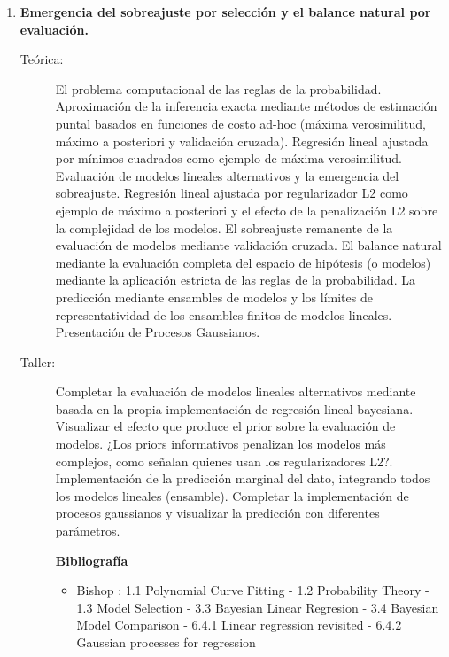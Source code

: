 \documentclass[11pt]{article}
\begin{document}
\begin{enumerate}
\item \textbf{Emergencia del sobreajuste por selección y el balance natural por evaluación.}
\vspace{-0.15cm}
\begin{description}
\item[Teórica:] El problema computacional de las reglas de la probabilidad. Aproximación de la inferencia exacta mediante métodos de estimación puntal basados en funciones de costo ad-hoc (máxima verosimilitud, máximo a posteriori y validación cruzada). Regresión lineal ajustada por mínimos cuadrados como ejemplo de máxima verosimilitud. Evaluación de modelos lineales alternativos y la emergencia del sobreajuste.
Regresión lineal ajustada por regularizador L2 como ejemplo de máximo a posteriori y el efecto de la penalización L2 sobre la complejidad de los modelos.
El sobreajuste remanente de la evaluación de modelos mediante validación cruzada.
El balance natural mediante la evaluación completa del espacio de hipótesis (o modelos) mediante la aplicación estricta de las reglas de la probabilidad.
La predicción mediante ensambles de modelos y los límites de representatividad de los ensambles finitos de modelos lineales.
Presentación de Procesos Gaussianos.
\item[Taller:]
Completar la evaluación de modelos lineales alternativos mediante basada en la propia implementación de regresión lineal bayesiana.
Visualizar el efecto que produce el prior sobre la evaluación de modelos.
¿Los priors informativos penalizan los modelos más complejos, como señalan quienes usan los regularizadores L2?.
Implementación de la predicción marginal del dato, integrando todos los modelos lineales (ensamble).
Completar la implementación de procesos gaussianos y visualizar la predicción con diferentes parámetros.
\item[] \textbf{Bibliografía}
\begin{itemize}
\item Bishop \cite{bishop2006-PRML}: 1.1 Polynomial Curve Fitting - 1.2 Probability Theory - 1.3 Model Selection - 3.3 Bayesian Linear Regresion - 3.4 Bayesian Model Comparison - 6.4.1 Linear regression revisited - 6.4.2 Gaussian processes for regression
\end{itemize}
\end{description}



\end{enumerate}
\end{document}
